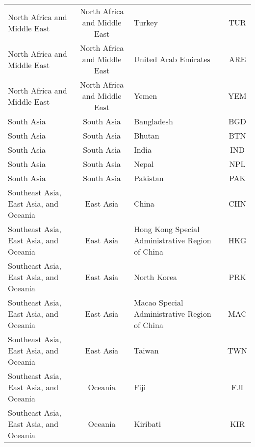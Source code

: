 \begin{landscape}
\begin{longtable}{|p{6cm}|c|p{5cm}|c|}
                     North Africa and Middle East &   North Africa and Middle East &                                            Turkey &  TUR \\
                     North Africa and Middle East &   North Africa and Middle East &                              United Arab Emirates &  ARE \\
                     North Africa and Middle East &   North Africa and Middle East &                                             Yemen &  YEM \\
                                       South Asia &                   South Asia &                                        Bangladesh &  BGD \\
                                       South Asia &                   South Asia &                                            Bhutan &  BTN \\
                                       South Asia &                   South Asia &                                             India &  IND \\
                                       South Asia &                   South Asia &                                             Nepal &  NPL \\
                                       South Asia &                   South Asia &                                          Pakistan &  PAK \\
           Southeast Asia, East Asia, and Oceania &                    East Asia &                                             China &  CHN \\
           Southeast Asia, East Asia, and Oceania &                    East Asia &  Hong Kong Special Administrative Region of China &  HKG \\
           Southeast Asia, East Asia, and Oceania &                    East Asia &                                       North Korea &  PRK \\
           Southeast Asia, East Asia, and Oceania &                    East Asia &      Macao Special Administrative Region of China &  MAC \\
           Southeast Asia, East Asia, and Oceania &                    East Asia &                                            Taiwan &  TWN \\
           Southeast Asia, East Asia, and Oceania &                      Oceania &                                              Fiji &  FJI \\
           Southeast Asia, East Asia, and Oceania &                      Oceania &                                          Kiribati &  KIR \\

\end{longtable}
\end{landscape}
